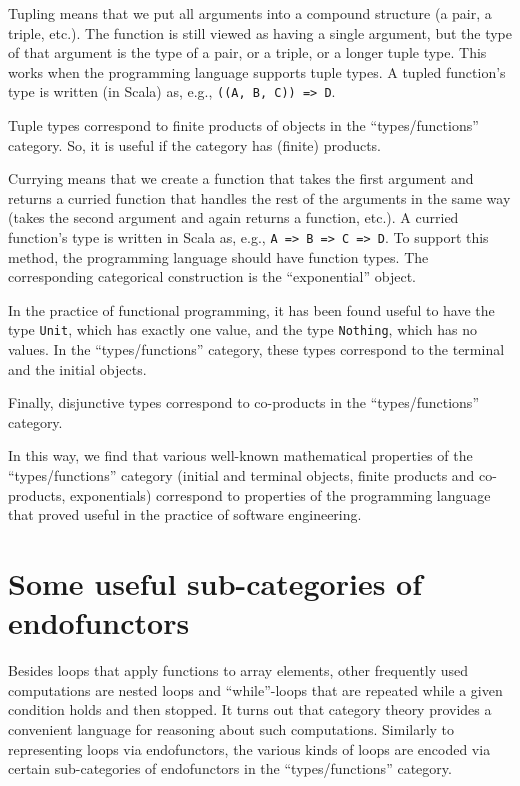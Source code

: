 Tupling means that we put all arguments into a compound structure
(a pair, a triple, etc.). The function is still viewed as having a
single argument, but the type of that argument is the type of a pair,
or a triple, or a longer tuple type. This works when the programming
language supports tuple types. A tupled function\textsf{'}s type is written
(in Scala) as, e.g., \lstinline!((A, B, C)) => D!.

Tuple types correspond to finite products of objects in the \textsf{``}types/functions\textsf{''}
category. So, it is useful if the category has (finite) products. 

Currying means that we create a function that takes the first argument
and returns a curried function that handles the rest of the arguments
in the same way (takes the second argument and again returns a function,
etc.). A curried function\textsf{'}s type is written in Scala as, e.g., \lstinline!A => B => C => D!.
To support this method, the programming language should have function
types. The corresponding categorical construction is the \textsf{``}exponential\textsf{''}
object. 

In the practice of functional programming, it has been found useful
to have the type \lstinline!Unit!, which has exactly one value, and
the type \lstinline!Nothing!, which has no values. In the \textsf{``}types/functions\textsf{''}
category, these types correspond to the terminal and the initial objects.

Finally, disjunctive types correspond to co-products in the \textsf{``}types/functions\textsf{''}
category.

In this way, we find that various well-known mathematical properties
of the \textsf{``}types/functions\textsf{''} category (initial and terminal objects,
finite products and co-products, exponentials) correspond to properties
of the programming language that proved useful in the practice of
software engineering.

\section{Some useful sub-categories of endofunctors}

Besides loops that apply functions to array elements, other frequently
used computations are nested loops and \textsf{``}while\textsf{''}-loops that are
repeated while a given condition holds and then stopped. It turns
out that category theory provides a convenient language for reasoning
about such computations. Similarly to representing loops via endofunctors,
the various kinds of loops are encoded via certain sub-categories
of endofunctors in the \textsf{``}types/functions\textsf{''} category.

